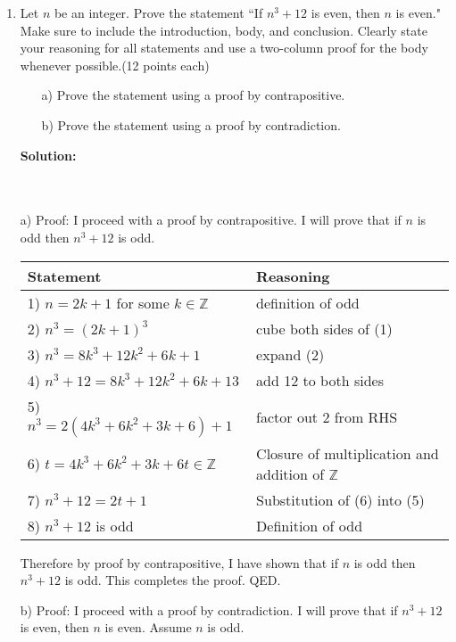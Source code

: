 \documentclass{article}
\newenvironment{solution}
{
\par
\color{blue}
\textbf{Solution:}
}
{
\par
}
\begin{document}
\begin{enumerate}
    \item{Let $n$ be an integer. Prove the statement ``If $n^3 + 12$ is even, then $n$ is even." Make sure to include the introduction, body, and conclusion. Clearly state your reasoning for all statements and use a two-column proof for the body whenever possible.\hfill\hfill \color{blue}(12 points each)}
    \begin{enumerate}
        \item[a)] Prove the statement using a proof by contrapositive.
        \item[b)] Prove the statement using a proof by contradiction.
    \end{enumerate}
    \color{blue}
    \begin{solution}
    \\
    \\ a) Proof: I proceed with a proof by contrapositive. I will prove that if $n$ is odd then $n^3 + 12$ is odd.
    
    \begin{tabular}{l|l}
    Statement & Reasoning \\ \hline
    1) $n = 2k + 1$ for some $k \in \mathbb{Z}$ & definition of odd\\
    2) $n^3 = (2k+1)^3$ & cube both sides of (1)\\
    3) $n^3 = 8k^3 + 12k^2 + 6k + 1$ & expand (2)\\
    4) $n^3 + 12 = 8k^3 + 12k^2 + 6k + 13$ & add 12 to both sides\\
    5) $n^3 = 2(4k^3 + 6k^2 + 3k + 6) + 1$ & factor out 2 from RHS\\
    6) $t = 4k^3 + 6k^2 + 3k + 6 t \in \mathbb{Z}$ & Closure of multiplication and addition of $\mathbb{Z}$ \\
    7) $n^3 + 12 = 2t + 1$ & Substitution of (6) into (5)\\
    8) $n^3 + 12$ is odd & Definition of odd\\
    \end{tabular}
    
    Therefore by proof by contrapositive, I have shown that if $n$ is odd then $n^3 + 12$ is odd. This completes the proof. QED.
    
    b) Proof: I proceed with a proof by contradiction. I will prove that if $n^3 + 12$ is even, then $n$ is even. Assume $n$ is odd.
    

\end{solution}
\end{enumerate}
\end{document}
